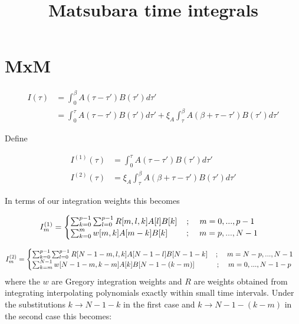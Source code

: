 \documentclass[]{article}
\title{Matsubara time integrals}
\author{}
\begin{document}
\maketitle

\begin{abstract}

\end{abstract}

\section{MxM}

\[
\begin{split}
I(\tau) &= \int_0^\beta A(\tau-\tau')B(\tau') d\tau' \\
        &= \int_0^\tau A(\tau-\tau')B(\tau') d\tau' + \xi_A \int_\tau^\beta A(\beta+\tau-\tau')B(\tau') d\tau'
\end{split}
\]

Define 

\[
\begin{split}
I^{(1)}(\tau) &=  \int_0^\tau A(\tau-\tau')B(\tau') d\tau' \\
I^{(2)}(\tau) &= \xi_A \int_\tau^\beta A(\beta+\tau-\tau')B(\tau') d\tau'
\end{split}
\]

In terms of our integration weights this becomes

\[
I^{(1)}_m =\begin{cases}
           \sum_{k=0}^{p-1} \sum_{l=0}^{p-1} R[m,l,k] A[l] B[k] \hspace{0.4cm}; \hspace{0.4cm} m=0,...,p-1\\
           \sum_{k=0}^m w[m,k] A[m-k] B[k] \hspace{0.8cm}; \hspace{0.4cm} m=p,...,N-1
           \end{cases}
\]

\[
I^{(2)}_m =\begin{cases}
           \sum_{k=0}^{p-1} \sum_{l=0}^{p-1} R[N-1-m,l,k] A[N-1-l] B[N-1-k] \hspace{0.4cm}; \hspace{0.4cm} m=N-p,...,N-1\\
           \sum_{k=m}^{N-1} w[N-1-m,k-m] A[k] B[N-1-(k-m)] \hspace{1.1cm}; \hspace{0.4cm} m=0,...,N-1-p
           \end{cases}
\]
where the $w$ are Gregory integration weights and $R$ are weights obtained from integrating interpolating polynomials exactly within small time intervals. Under the substitutions $k \rightarrow N-1-k$ in the first case and $k \rightarrow N-1-(k-m)$ in the second case this becomes:
\end{document}
